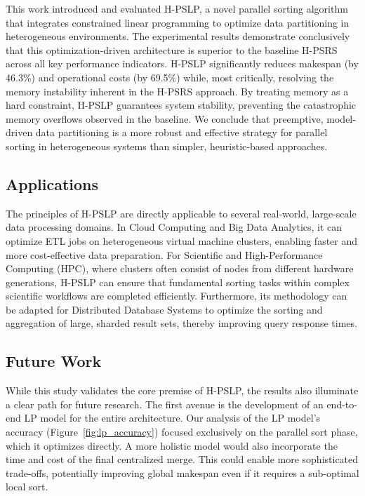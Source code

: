 \documentclass{article}
\begin{document}
This work introduced and evaluated H-PSLP, a novel parallel sorting algorithm that integrates constrained linear programming to optimize data partitioning in heterogeneous environments. The experimental results demonstrate conclusively that this optimization-driven architecture is superior to the baseline H-PSRS across all key performance indicators. H-PSLP significantly reduces makespan (by 46.3\%) and operational costs (by 69.5\%) while, most critically, resolving the memory instability inherent in the H-PSRS approach. By treating memory as a hard constraint, H-PSLP guarantees system stability, preventing the catastrophic memory overflows observed in the baseline. We conclude that preemptive, model-driven data partitioning is a more robust and effective strategy for parallel sorting in heterogeneous systems than simpler, heuristic-based approaches.

\subsection{Applications}

The principles of H-PSLP are directly applicable to several real-world, large-scale data processing domains. In Cloud Computing and Big Data Analytics, it can optimize ETL jobs on heterogeneous virtual machine clusters, enabling faster and more cost-effective data preparation. For Scientific and High-Performance Computing (HPC), where clusters often consist of nodes from different hardware generations, H-PSLP can ensure that fundamental sorting tasks within complex scientific workflows are completed efficiently. Furthermore, its methodology can be adapted for Distributed Database Systems to optimize the sorting and aggregation of large, sharded result sets, thereby improving query response times.

\subsection{Future Work}

While this study validates the core premise of H-PSLP, the results also illuminate a clear path for future research. The first avenue is the development of an end-to-end LP model for the entire architecture. Our analysis of the LP model's accuracy (Figure~\ref{fig:lp_accuracy}) focused exclusively on the parallel sort phase, which it optimizes directly. A more holistic model would also incorporate the time and cost of the final centralized merge. This could enable more sophisticated trade-offs, potentially improving global makespan even if it requires a sub-optimal local sort.
\end{document}

